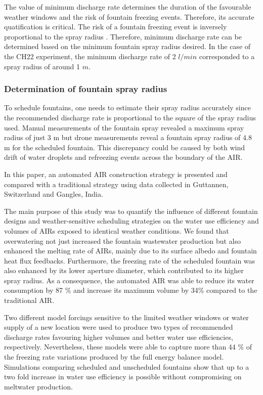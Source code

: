 \documentclass[tc, manuscript]{copernicus}
\begin{document}
The value of minimum discharge rate determines the duration of the favourable weather windows and the risk of
fountain freezing events. Therefore, its accurate quatification is critical. The risk of a fountain freezing
event is inversely proportional to the spray radius . Therefore, minimum discharge rate can be determined based
on the minimum fountain spray radius desired. In the case of the CH22 experiment, the minimum discharge rate of
2 $l/min$ corresponded to a spray radius of around 1 $m$.

\subsubsection{Determination of fountain spray radius}

To schedule fountains, one needs to estimate their spray radius accurately since the recommended discharge rate
is proportional to the square of the spray radius used.  Manual measurements of the fountain spray revealed a
maximum spray radius of just 3 m but drone measurements reveal a fountain spray radius of 4.8 m for the
scheduled fountain. This discrepancy could be caused by both wind drift of water droplets and refreezing events
across the boundary of the AIR. 

\conclusions

In this paper, an automated AIR construction strategy is presented and compared with a traditional strategy
using data collected in Guttannen, Switzerland and Gangles, India.

The main purpose of this study was to quantify the influence of different fountain designs and weather-sensitive
scheduling strategies on the water use efficiency and volumes of AIRs exposed to identical weather conditions.
We found that overwatering not just increased the fountain wastewater production but also enhanced the melting
rate of AIRs, mainly due to its surface albedo and fountain heat flux feedbacks. Furthermore, the freezing rate
of the scheduled fountain was also enhanced by its lower aperture diameter, which contributed to its higher
spray radius. As a consequence, the automated AIR was able to reduce its water consumption by 87 \% and increase
its maximum volume by 34\% compared to the traditional AIR.

Two different model forcings sensitive to the limited weather windows or water supply of a new location were
used to produce two types of recommended discharge rates favouring higher volumes and better water use
efficiencies, respectively. Nevertheless, these models were able to capture more than 44 \% of the freezing rate
variations produced by the full energy balance model. Simulations comparing scheduled and unscheduled fountains
show that up to a two fold increase in water use efficiency is possible without compromising on meltwater
production.
\end{document}
